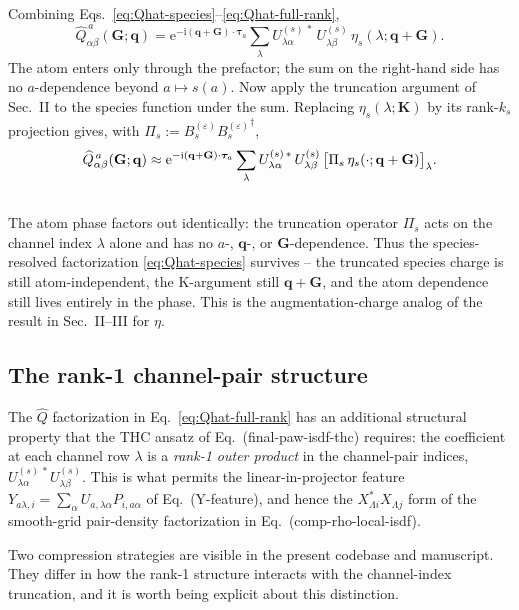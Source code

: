 \documentclass[aps,prb,reprint,superscriptaddress,nofootinbib]{revtex4-2}
\newcommand{\bG}{\mathbf G}
\newcommand{\bq}{\mathbf q}
\newcommand{\btau}{\boldsymbol\tau}
\newcommand{\ee}{\mathrm e}
\newcommand{\ii}{\mathrm i}
\begin{document}
Combining Eqs.~\eqref{eq:Qhat-species}--\eqref{eq:Qhat-full-rank},
\begin{equation}
\widehat Q^{\,a}_{\alpha\beta}(\bG;\bq)
=\ee^{-\ii(\bq+\bG)\cdot\btau_a}
\sum_\lambda U^{(s)\,*}_{\lambda\alpha}\,U^{(s)}_{\lambda\beta}\,
\eta_s(\lambda;\bq+\bG).
\label{eq:Qhat-original}
\end{equation}
The atom enters only through the prefactor; the sum on the right-hand
side has no \(a\)-dependence beyond \(a\!\mapsto\!s(a)\).  Now apply
the truncation argument of Sec.~II to the species function under the
sum.  Replacing \(\eta_s(\lambda;\mathbf K)\) by its rank-\(k_s\)
projection gives, with \(\Pi_s:=B_s^{(\varepsilon)}{B_s^{(\varepsilon)}}^\dagger\),
\begin{align}
\widehat Q^{\,a}_{\alpha\beta}(\bG;\bq)
&\approx
\ee^{-\ii(\bq+\bG)\cdot\btau_a}
\sum_\lambda U^{(s)\,*}_{\lambda\alpha}\,U^{(s)}_{\lambda\beta}\,
\bigl[\Pi_s\,\eta_s(\cdot;\bq+\bG)\bigr]_\lambda. \notag\\
&\quad
\label{eq:Qhat-projected}
\end{align}
The atom phase factors out identically: the truncation operator
\(\Pi_s\) acts on the channel index \(\lambda\) alone and has no
\(a\)-, \(\bq\)-, or \(\bG\)-dependence.  Thus the species-resolved
factorization \eqref{eq:Qhat-species} survives -- the truncated
species charge is still atom-independent, the K-argument still
\(\bq+\bG\), and the atom dependence still lives entirely in the phase.
This is the augmentation-charge analog of the result in
Sec.~II--III for \(\eta\).

\subsection{The rank-1 channel-pair structure}

The \(\widehat Q\) factorization in Eq.~\eqref{eq:Qhat-full-rank} has
an additional structural property that the THC ansatz of
Eq.~(final-paw-isdf-thc) requires: the coefficient at each channel row
\(\lambda\) is a \emph{rank-1 outer product} in the channel-pair
indices, \(U^{(s)\,*}_{\lambda\alpha}U^{(s)}_{\lambda\beta}\).  This is
what permits the linear-in-projector feature
\(Y_{a\lambda,i}=\sum_\alpha U_{a,\lambda\alpha}P_{i,a\alpha}\) of
Eq.~(Y-feature), and hence the
\(X_{\Lambda i}^{*}X_{\Lambda j}\) form of the smooth-grid pair-density
factorization in Eq.~(comp-rho-local-isdf).

Two compression strategies are visible in the present codebase and
manuscript.  They differ in how the rank-1 structure interacts with
the channel-index truncation, and it is worth being explicit about
this distinction.
\end{document}
